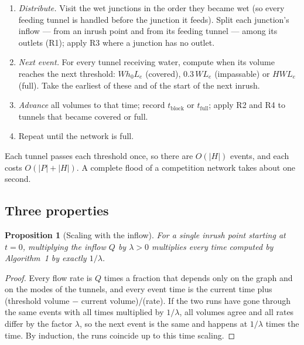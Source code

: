 \documentclass[11pt,a4paper]{article}
\newtheorem{proposition}{Proposition}
\theoremstyle{remark}
\newcommand{\tblock}{t_{\mathrm{block}}}
\newcommand{\tfull}{t_{\mathrm{full}}}
\begin{document}
\begin{tcolorbox}[colback=gray!4, colframe=gray!45, boxrule=0.4pt, arc=1pt, fontupper=\small, title={\small Algorithm 1: volume-conserving flood simulation}, coltitle=black, colbacktitle=gray!15, left=5pt]
\begin{enumerate}[label=\arabic*., leftmargin=1.6em, itemsep=0pt, topsep=0pt]
  \item \emph{Distribute.} Visit the wet junctions in the order they became wet (so every feeding tunnel is handled before the junction it feeds). Split each junction's inflow --- from an inrush point and from its feeding tunnel --- among its outlets (R1); apply R3 where a junction has no outlet.
  \item \emph{Next event.} For every tunnel receiving water, compute when its volume reaches the next threshold: $W h_0 L_e$ (covered), $0.3\,W L_e$ (impassable) or $H W L_e$ (full). Take the earliest of these and of the start of the next inrush.
  \item \emph{Advance} all volumes to that time; record $\tblock$ or $\tfull$; apply R2 and R4 to tunnels that became covered or full.
  \item Repeat until the network is full.
\end{enumerate}
\end{tcolorbox}

Each tunnel passes each threshold once, so there are $O(|H|)$ events, and each costs $O(|P|+|H|)$. A complete flood of a competition network takes about one second.

\subsection{Three properties}\label{sec:props}

\begin{proposition}[Scaling with the inflow]
For a single inrush point starting at $t=0$, multiplying the inflow $Q$ by $\lambda>0$ multiplies every time computed by Algorithm~1 by exactly $1/\lambda$.
\end{proposition}
\begin{proof}
Every flow rate is $Q$ times a fraction that depends only on the graph and on the modes of the tunnels, and every event time is the current time plus (threshold volume $-$ current volume)/(rate). If the two runs have gone through the same events with all times multiplied by $1/\lambda$, all volumes agree and all rates differ by the factor $\lambda$, so the next event is the same and happens at $1/\lambda$ times the time. By induction, the runs coincide up to this time scaling.
\end{proof}
\end{document}
